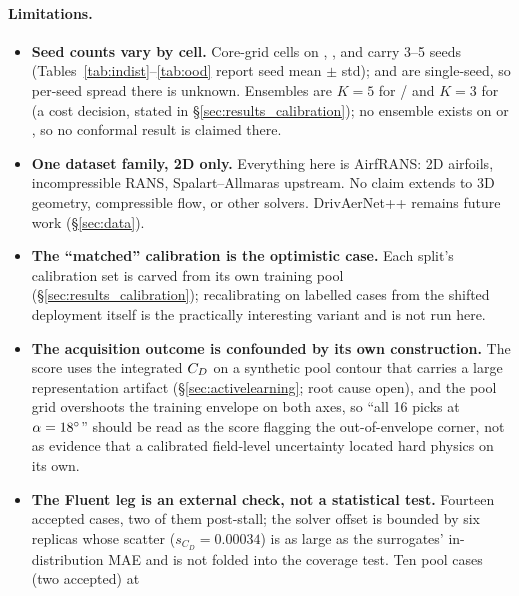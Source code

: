 \paragraph{Limitations.}
\begin{itemize}\itemsep2pt
  \item \textbf{Seed counts vary by cell.} Core-grid cells on ,
        ,  and  carry
        3--5 seeds (Tables~\ref{tab:indist}--\ref{tab:ood} report seed mean
        $\pm$ std);  and  are
        single-seed, so per-seed spread there is unknown. Ensembles are $K=5$
        for \Mfno/\Mtrans{} and $K=3$ for \Mgnn{} (a cost decision, stated in
        \S\ref{sec:results_calibration}); no ensemble exists on
         or , so no conformal result is
        claimed there.
  \item \textbf{One dataset family, 2D only.} Everything here is AirfRANS:
        2D airfoils, incompressible RANS, Spalart--Allmaras upstream. No claim
        extends to 3D geometry, compressible flow, or other solvers.
        DrivAerNet++ remains future work (\S\ref{sec:data}).
  \item \textbf{The ``matched'' calibration is the optimistic case.} Each
        split's calibration set is carved from its own training pool
        (\S\ref{sec:results_calibration}); recalibrating on labelled cases
        from the shifted deployment itself is the practically interesting
        variant and is not run here.
  \item \textbf{The acquisition outcome is confounded by its own
        construction.} The score uses the integrated $C_D$ on a synthetic
        pool contour that carries a large representation artifact
        (\S\ref{sec:activelearning}; root cause open), and the pool grid
        overshoots the training envelope on both axes, so ``all 16 picks at
        $\alpha=18^{\circ}$'' should be read as the score flagging the
        out-of-envelope corner, not as evidence that a calibrated field-level
        uncertainty located hard physics on its own.
  \item \textbf{The Fluent leg is an external check, not a statistical
        test.} Fourteen accepted cases, two of them post-stall; the solver
        offset is bounded by six replicas whose scatter ($s_{C_D}=0.00034$)
        is as large as the surrogates' in-distribution MAE and is not folded
        into the coverage test. Ten pool cases (two accepted) at

\end{itemize}
